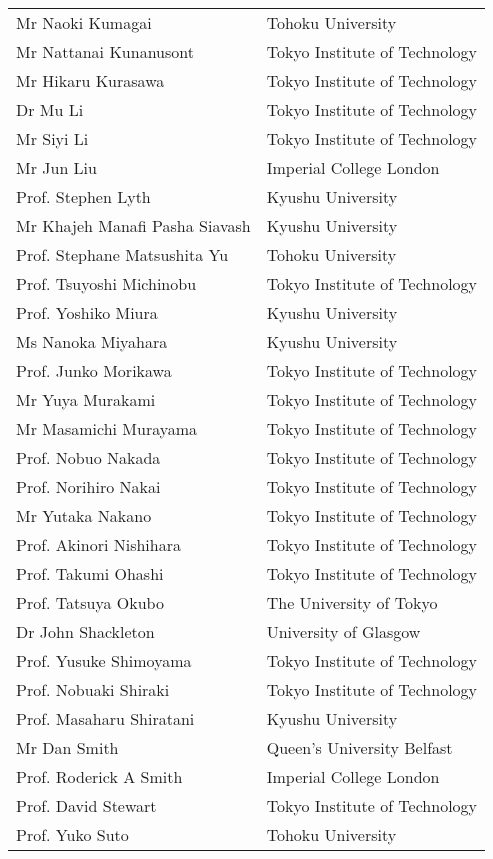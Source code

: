 \begin{longtable}{ll}
Mr  Naoki Kumagai & Tohoku University \\
Mr  Nattanai Kunanusont & Tokyo Institute of Technology \\
Mr  Hikaru Kurasawa & Tokyo Institute of Technology \\
Dr Mu Li & Tokyo Institute of Technology \\
Mr  Siyi Li & Tokyo Institute of Technology \\
Mr  Jun Liu & Imperial College London \\
Prof. Stephen Lyth & Kyushu University \\
Mr  Khajeh Manafi Pasha Siavash	& Kyushu University \\
Prof. Stephane Matsushita Yu & Tohoku University \\
Prof. Tsuyoshi Michinobu & Tokyo Institute of Technology \\
Prof. Yoshiko Miura & Kyushu University \\
Ms  Nanoka Miyahara & Kyushu University \\
Prof. Junko Morikawa & Tokyo Institute of Technology \\
Mr  Yuya Murakami & Tokyo Institute of Technology \\
Mr  Masamichi Murayama & Tokyo Institute of Technology \\
Prof. Nobuo Nakada & Tokyo Institute of Technology \\
Prof. Norihiro Nakai & Tokyo Institute of Technology \\
Mr  Yutaka Nakano & Tokyo Institute of Technology \\
Prof. Akinori Nishihara & Tokyo Institute of Technology \\
Prof. Takumi Ohashi & Tokyo Institute of Technology \\
Prof. Tatsuya Okubo & The University of Tokyo \\
Dr John Shackleton & University of Glasgow \\
Prof. Yusuke Shimoyama & Tokyo Institute of Technology \\
Prof. Nobuaki Shiraki & Tokyo Institute of Technology \\
Prof. Masaharu Shiratani & Kyushu University \\
Mr  Dan Smith & Queen's University Belfast \\
Prof. Roderick A Smith & Imperial College London \\
Prof. David Stewart & Tokyo Institute of Technology \\
Prof. Yuko Suto & Tohoku University \\

\end{longtable}
